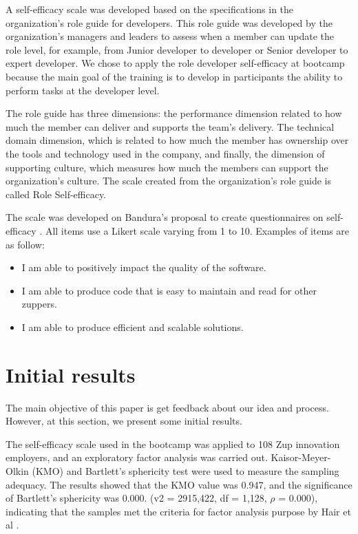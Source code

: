 \documentclass[10pt, conference]{IEEEtran}
\begin{document}
A  self-efficacy scale was developed based on the specifications in the organization's role guide for developers. This role guide was developed by the organization's managers and leaders to assess when a member can update the role level, for example, from Junior developer to developer or Senior developer to expert developer. We chose to apply the role developer self-efficacy at bootcamp because the main goal of the training is to develop in participants the ability to perform tasks at the developer level.

The role guide has three dimensions: the performance dimension related to how much the member can deliver and supports the team's delivery. The technical domain dimension, which is related to how much the member has ownership over the tools and technology used in the company, and finally, the dimension of supporting culture, which measures how much the members can support the organization's culture. The scale created from the organization's role guide is called Role Self-efficacy.

The scale was developed on Bandura's proposal to create questionnaires on self-efficacy \cite{bandura2010self}. All items use a Likert scale varying from 1 to 10. Examples of items are as follow:


\begin{itemize}
\item I am able to positively impact the quality of the software.
\item I am able to produce code that is easy to maintain and read for other zuppers.
\item I am able to produce efficient and scalable solutions.
\end{itemize}


\section{Initial results}

The main objective of this paper is get feedback about our idea and process. However, at this section, we present some initial results.


The self-efficacy scale used in the bootcamp was applied to 108 Zup innovation employers, and an exploratory factor analysis was carried out.
Kaisor-Meyer-Olkin (KMO) and Bartlett’s sphericity test were used to
measure the sampling adequacy. The results showed that the KMO value was 0.947, and the significance of Bartlett’s sphericity was 0.000. (v2 = 2915,422, df = 1,128,
$\rho$ = 0.000), indicating that the samples met the criteria for
factor analysis purpose by Hair et al \cite{hair2009multivariate}.
\end{document}
